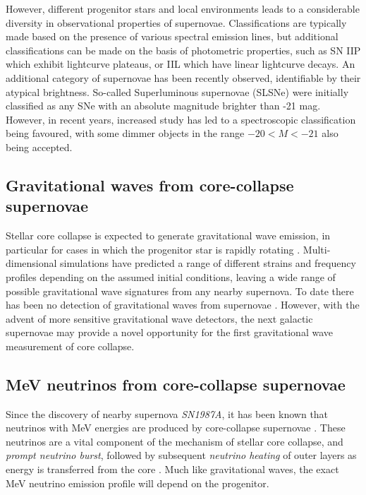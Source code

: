 However, different progenitor stars and local environments leads to a considerable diversity in observational properties of supernovae. Classifications are typically made based on the presence of various spectral emission lines, but additional classifications can be made on the basis of photometric properties, such as SN IIP which exhibit lightcurve plateaus, or IIL which have linear lightcurve decays. An additional category of supernovae has been recently observed, identifiable by their atypical brightness. So-called Superluminous supernovae (SLSNe) were initially classified as any SNe with an absolute magnitude brighter than -21 mag. However, in recent years, increased study has led to a spectroscopic classification being favoured, with some dimmer objects in the range $-20 < M < -21$ also being accepted. 

\subsection*{Gravitational waves from core-collapse supernovae}

Stellar core collapse is expected to generate gravitational wave emission, in particular for cases in which the  progenitor star is rapidly rotating . Multi-dimensional simulations have predicted a range of different strains and frequency profiles depending on the assumed initial conditions, leaving a wide range of possible gravitational wave signatures from any nearby supernova. To date there has been no detection of gravitational waves from supernovae . However, with the advent of more sensitive gravitational wave detectors, the next galactic supernovae may provide a novel opportunity for the first gravitational wave measurement of core collapse.

\subsection*{MeV neutrinos from core-collapse supernovae}

Since the discovery of nearby supernova \emph{SN1987A}, it has been known that neutrinos with MeV energies are produced by core-collapse supernovae . These neutrinos are a vital component of the mechanism of stellar core collapse, and \emph{prompt neutrino burst}, followed by subsequent \emph{neutrino heating} of outer layers as energy is transferred from the core . Much like gravitational waves, the exact MeV neutrino emission profile will depend on the progenitor.

